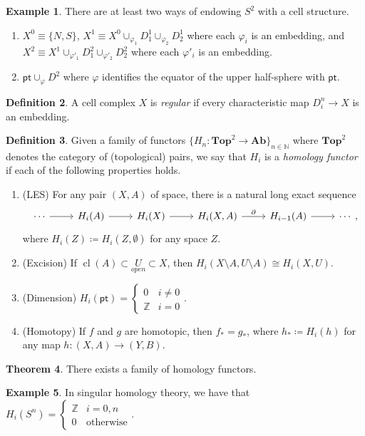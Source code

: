 \documentclass[10pt,letterpaper,cm]{nupset}
\theoremstyle{definition}
\newtheorem{defn}{Definition}[subsection]
\newtheorem{exmp}[defn]{Example}
\theoremstyle{theorem}
\newtheorem{theorem}[defn]{Theorem}
\theoremstyle{remark}
\newcommand{\N}{\mathbb N}
\newcommand{\Z}{\mathbb Z}
\newcommand{\1}{\mathbb{1}}
\newcommand{\0}{\vec 0}
\newcommand{\pt}{\mathsf{pt}}
\DeclareMathOperator{\cl}{cl}
\newcommand{\be}{\begin{enumerate}}
\newcommand{\ee}{\end{enumerate}}
\begin{document}
\begin{exmp} There are at least two ways of endowing $S^2$ with a cell structure.
\be
\item $X^0 \equiv \{N, S\}$, $X^1 \equiv X^0 \cup_{\varphi_1} D_1^1 \cup_{\varphi_2} D_2^1$ where each $\varphi_i$ is an embedding, and $X^2 \equiv X^1  \cup_{\varphi'_1} D_1^2 \cup_{\varphi'_2} D_2^2$ where each $\varphi'_i$ is an embedding. 
\item $\pt \cup_{\varphi} D^2$ where $\varphi$ identifies the equator of the upper half-sphere with $\pt$.
\ee
\end{exmp}

\begin{defn}
A cell complex $X$ is \textit{regular} if every characteristic map $D_i^n \to X$ is an embedding. 
\end{defn}

\begin{defn}
Given a family of functors $\{H_n : \mathbf{Top}^2 \to \mathbf{Ab}\}_{n\in \N}$ where $\mathbf{Top}^2$ denotes the category of (topological) pairs, we say that $H_i$ is a \textit{homology functor} if  each of the following properties holds.
\be
\item (LES) For any pair $(X, A)$ of space, there is a natural long exact sequence
\[
\begin{tikzcd}
\cdots \arrow[r] & H_i(A)  \arrow[r] & H_i(X) \arrow[r] & {H_i(X, A)} \arrow[r, "\partial"] & H_{i-1}(A) \arrow[r] & \cdots
\end{tikzcd},
\] where $H_i(Z) \coloneqq H_i(Z, \emptyset)$ for any space $Z$.
\item (Excision) If $\cl(A) \subset \underset{open}{U} \subset X$, then $H_i(X\setminus A, U \setminus A) \cong H_i(X, U)$.
\item (Dimension) $H_i(\pt) = \begin{cases} 0 & i \ne 0 \\ \Z & i =0 \end{cases}$.
\item (Homotopy) If $f$ and $g$ are homotopic, then $f_{\ast} = g_{\ast}$, where $h_{\ast} \coloneqq H_i(h)$ for any map $h: (X,A) \to (Y, B)$. 
\ee
\end{defn}

\begin{theorem}
There exists a family of homology functors.
\end{theorem}

\begin{exmp}
In singular homology theory, we have that $H_i(S^n) = \begin{cases} \Z & i = 0, n \\ 0 & \text{otherwise} \end{cases}.$ 
\end{exmp}
\end{document}

